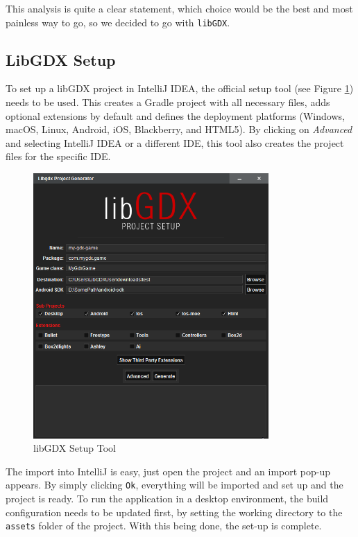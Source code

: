 \documentclass[12p]{article}
\begin{document}
This analysis is quite a clear statement, which choice would be the best and most painless way to go, so we decided to go with \texttt{libGDX}.


\newpage
\subsection{LibGDX Setup} \label{DocSetup}

To set up a libGDX project in IntelliJ IDEA, the official setup tool (see Figure \ref{fig:LibGDXSetupScreenshot}) needs to be used. This creates a Gradle project with all necessary files, adds optional extensions by default and defines the deployment platforms (Windows, macOS, Linux, Android, iOS, Blackberry, and HTML5). By clicking on \emph{Advanced} and selecting IntelliJ IDEA or a different IDE, this tool also creates the project files for the specific IDE.

\begin{figure}[ht]
 \centering
 \includegraphics[width=0.8\textwidth]{libGDX_setup.png}
 \caption{libGDX Setup Tool}
 \label{fig:LibGDXSetupScreenshot}
\end{figure}

The import into IntelliJ is easy, just open the project and an import pop-up appears. By simply clicking \texttt{Ok}, everything will be imported and set up and the project is ready. To run the application in a desktop environment, the build configuration needs to be updated first, by setting the working directory to the \texttt{assets} folder of the project. With this being done, the set-up is complete.
\end{document}
